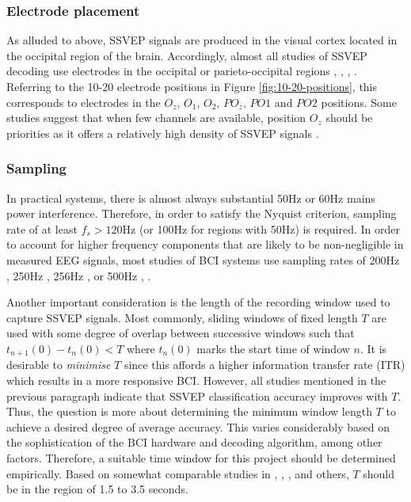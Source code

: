 \subsubsection{Electrode placement}
As alluded to above, SSVEP signals are produced in the visual cortex located in the occipital region of the brain. Accordingly, almost all studies of SSVEP decoding use electrodes in the occipital or parieto-occipital regions \cite{autthasan-single-chan-ssvep}, \cite{acampora-dataset}, \cite{chu-ssvep-colours}, \cite{chu-ssvep-colours}. Referring to the 10-20 electrode positions in Figure \ref{fig:10-20-positions}, this corresponds to electrodes in the $O_z, \, O_1,\, O_2,\, PO_z,\, PO1$ and $PO2$ positions. Some studies suggest that when few channels are available, position $O_z$ should be priorities as it offers a relatively high density of SSVEP signals \cite{autthasan-single-chan-ssvep}.

\subsubsection{Sampling}
\label{subsection:time-frequency-considerations-c2}
In practical systems, there is almost always substantial 50Hz or 60Hz mains power interference. Therefore, in order to satisfy the Nyquist criterion, sampling rate of at least $f_s > 120$Hz (or 100Hz for regions with 50Hz) is required. In order to account for higher frequency components that are likely to be non-negligible in measured EEG signals, most studies of BCI systems use sampling rates of 200Hz \cite{peterson-bci-survey}, 250Hz \cite{zhang-mset-cca}, 256Hz \cite{miao-hybrid-cca}, \cite{nakanishi-cca-comparison} or 500Hz \cite{varnavas-phd}, \cite{duart-comparing-ssvep-stimuli}.

Another important consideration is the length of the recording window used to capture SSVEP signals. Most commonly, sliding windows of fixed length $T$ are used with some degree of overlap between successive windows such that $t_{n+1}{(0)} - t_{n}{(0)} < T$ where $t_n{(0)}$ marks the start time of window $n$. It is desirable to \textit{minimise} $T$ since this affords a higher information transfer rate (ITR) which results in a more responsive BCI. However, all studies mentioned in the previous paragraph indicate that SSVEP classification accuracy improves with $T$. Thus, the question is more about determining the minimum window length $T$ to achieve a desired degree of average accuracy. This varies considerably based on the sophistication of the BCI hardware and decoding algorithm, among other factors. Therefore, a suitable time window for this project should be determined empirically. Based on somewhat comparable studies in \cite{uktveris-modular-bci}, \cite{chu-ssvep-colours}, \cite{autthasan-single-chan-ssvep}, \cite{liao-gaming-control} and others, $T$ should be in the region of 1.5 to 3.5 seconds.

